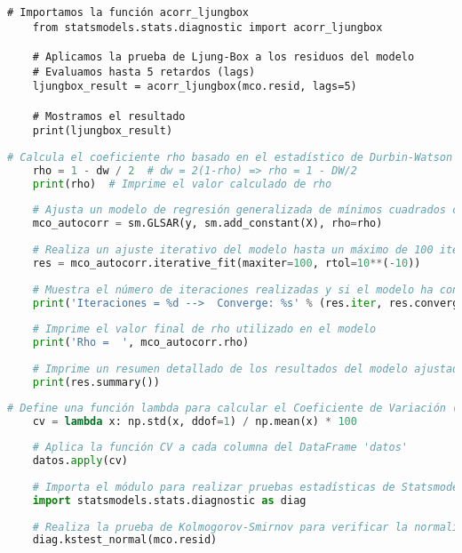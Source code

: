 \documentclass[a4paper,12pt]{article}
\begin{document}
\begin{lstlisting}[style=custompython, caption=Prueba de Ljung-Box para detectar autocorrelación]
    # Importamos la función acorr_ljungbox
    from statsmodels.stats.diagnostic import acorr_ljungbox
    
    # Aplicamos la prueba de Ljung-Box a los residuos del modelo
    # Evaluamos hasta 5 retardos (lags)
    ljungbox_result = acorr_ljungbox(mco.resid, lags=5)
    
    # Mostramos el resultado
    print(ljungbox_result)
\end{lstlisting}

\begin{lstlisting}[language=Python, style=custompython, caption={Implementación de autocorrelación usando GLSAR en Python.}]
    # Calcula el coeficiente rho basado en el estadístico de Durbin-Watson (DW)
    rho = 1 - dw / 2  # dw = 2(1-rho) => rho = 1 - DW/2
    print(rho)  # Imprime el valor calculado de rho
    
    # Ajusta un modelo de regresión generalizada de mínimos cuadrados con autocorrelación (GLSAR)
    mco_autocorr = sm.GLSAR(y, sm.add_constant(X), rho=rho)
    
    # Realiza un ajuste iterativo del modelo hasta un máximo de 100 iteraciones o hasta alcanzar la tolerancia
    res = mco_autocorr.iterative_fit(maxiter=100, rtol=10**(-10))
    
    # Muestra el número de iteraciones realizadas y si el modelo ha convergido
    print('Iteraciones = %d -->  Converge: %s' % (res.iter, res.converged))
    
    # Imprime el valor final de rho utilizado en el modelo
    print('Rho =  ', mco_autocorr.rho)
    
    # Imprime un resumen detallado de los resultados del modelo ajustado
    print(res.summary())
\end{lstlisting}

\begin{lstlisting}[language=Python, style=custompython, caption={Cálculo del Coeficiente de Variación (CV) y prueba de normalidad en los residuos.}]
    # Define una función lambda para calcular el Coeficiente de Variación (CV)
    cv = lambda x: np.std(x, ddof=1) / np.mean(x) * 100
    
    # Aplica la función CV a cada columna del DataFrame 'datos'
    datos.apply(cv)
    
    # Importa el módulo para realizar pruebas estadísticas de Statsmodels
    import statsmodels.stats.diagnostic as diag
    
    # Realiza la prueba de Kolmogorov-Smirnov para verificar la normalidad de los residuos del modelo 'mco'
    diag.kstest_normal(mco.resid)
\end{lstlisting}
\end{document}
